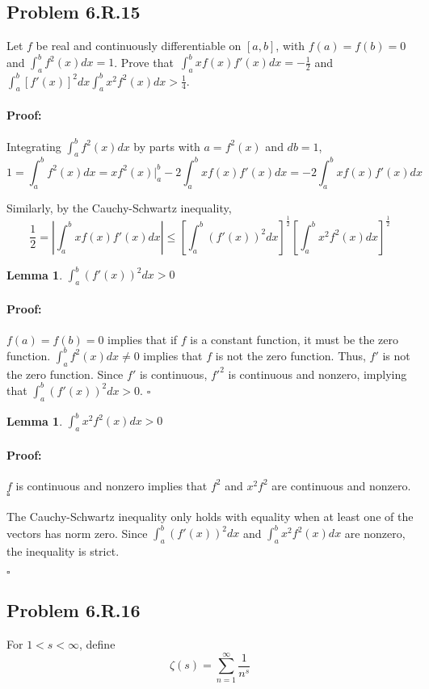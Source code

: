 \documentclass{article}
\newenvironment{proof}{\paragraph{Proof:}}{\hfill$\square$}
\newtheorem{lemma}[theorem]{Lemma}
\begin{document}
\subsection*{Problem 6.R.15}
Let $f$ be real and continuously differentiable on $[a, b]$, with $f(a) = f(b) = 0$ and $\int_a^b f^2(x)dx = 1$. Prove that\ $\int_a^b xf(x)f'(x)dx = -\frac{1}{2}$ and $\int_a^b[f'(x)]^2dx \int_a^b x^2f^2(x)dx > \frac{1}{4}$.

\begin{proof}
Integrating $\int_a^b f^2(x)dx$ by parts with $a = f^2(x)$ and $db = 1$,
\[
1 = \int_a^bf^2(x)dx = xf^2(x)\Big|_a^b - 2\int_a^bxf(x)f'(x)dx = - 2\int_a^bxf(x)f'(x)dx
\]

Similarly, by the Cauchy-Schwartz inequality,
\[
\frac{1}{2} = \left|\int_a^b xf(x)f'(x)dx \right|
\leq \left[ \int_a^b (f'(x))^2 dx\right]^\frac{1}{2} \left[ \int_a^b x^2f^2(x)dx \right]^\frac{1}{2}
\]

\begin{lemma}
$\int_a^b (f'(x))^2 dx > 0$
\end{lemma}

\begin{proof}
$f(a) = f(b) = 0$ implies that if $f$ is a constant function, it must be the zero function. $\int_a^b f^2(x)dx \neq 0$ implies that $f$ is not the zero function. Thus, $f'$ is not the zero function. Since $f'$ is continuous, ${f'}^2$ is continuous and nonzero, implying that $\int_a^b (f'(x))^2 dx > 0$.
\end{proof}

\begin{lemma}
$\int_a^b x^2 f^2(x) dx > 0$
\end{lemma}

\begin{proof}
$f$ is continuous and nonzero implies that $f^2$ and $x^2 f^2$ are continuous and nonzero.
\end{proof}

The Cauchy-Schwartz inequality only holds with equality when at least one of the vectors has norm zero. Since $\int_a^b (f'(x))^2 dx$ and $\int_a^b x^2 f^2(x) dx$ are nonzero, the inequality is strict.

\end{proof}

\subsection*{Problem 6.R.16}

For $1 < s < \infty$, define
\[
\zeta(s) = \sum_{n=1}^\infty \frac{1}{n^s}
\]
\end{document}
